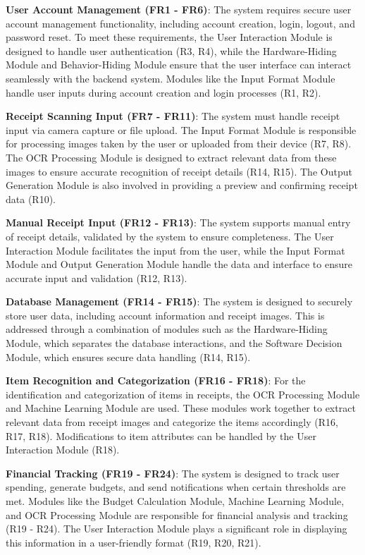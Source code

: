 \documentclass[12pt, titlepage]{article}
\begin{document}
\textbf{User Account Management (FR1 - FR6)}:  
The system requires secure user account management functionality, including account creation, login, logout, and password reset. To meet these requirements, the User Interaction Module is designed to handle user authentication (R3, R4), while the Hardware-Hiding Module and Behavior-Hiding Module ensure that the user interface can interact seamlessly with the backend system. Modules like the Input Format Module handle user inputs during account creation and login processes (R1, R2).

\textbf{Receipt Scanning Input (FR7 - FR11)}:  
The system must handle receipt input via camera capture or file upload. The Input Format Module is responsible for processing images taken by the user or uploaded from their device (R7, R8). The OCR Processing Module is designed to extract relevant data from these images to ensure accurate recognition of receipt details (R14, R15). The Output Generation Module is also involved in providing a preview and confirming receipt data (R10).

\textbf{Manual Receipt Input (FR12 - FR13)}:  
The system supports manual entry of receipt details, validated by the system to ensure completeness. The User Interaction Module facilitates the input from the user, while the Input Format Module and Output Generation Module handle the data and interface to ensure accurate input and validation (R12, R13).

\textbf{Database Management (FR14 - FR15)}:  
The system is designed to securely store user data, including account information and receipt images. This is addressed through a combination of modules such as the Hardware-Hiding Module, which separates the database interactions, and the Software Decision Module, which ensures secure data handling (R14, R15).

\textbf{Item Recognition and Categorization (FR16 - FR18)}:  
For the identification and categorization of items in receipts, the OCR Processing Module and Machine Learning Module are used. These modules work together to extract relevant data from receipt images and categorize the items accordingly (R16, R17, R18). Modifications to item attributes can be handled by the User Interaction Module (R18).

\textbf{Financial Tracking (FR19 - FR24)}:  
The system is designed to track user spending, generate budgets, and send notifications when certain thresholds are met. Modules like the Budget Calculation Module, Machine Learning Module, and OCR Processing Module are responsible for financial analysis and tracking (R19 - R24). The User Interaction Module plays a significant role in displaying this information in a user-friendly format (R19, R20, R21).
\end{document}

